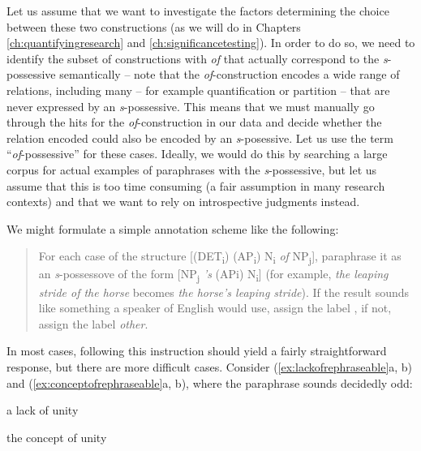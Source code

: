 Let us assume that we want to investigate the factors determining the choice between these two constructions (as we will do in Chapters \ref{ch:quantifyingresearch} and \ref{ch:significancetesting}). In order to do so, we need to identify the subset of constructions with \textit{of} that actually correspond to the \textit{s}-possessive semantically -- note that the \textit{of}-construction encodes a wide range of relations, including many -- for example quantification or partition -- that are never expressed by an \textit{s}-possessive. This means that we must manually go through the hits for the \textit{of}-construction in our data and decide whether the relation encoded could also be encoded by an \textit{s}-posessive. Let us use the term ``\textit{of}-possessive'' for these cases. Ideally, we would do this by searching a large corpus for actual examples of paraphrases with the \textit{s}-possessive, but let us assume that this is too time consuming (a fair assumption in many research contexts) and that we want to rely on introspective judgments instead.

We might formulate a simple annotation scheme like the following:

\begin{quote}
For each case of the structure [(DET\textsubscript{i}) (AP\textsubscript{i}) N\textsubscript{i} \textit{of} NP\textsubscript{j}], paraphrase it as an \textit{s}-possessove of the form [NP\textsubscript{j} \textit{'s} (APi) N\textsubscript{i}] (for example, \textit{the leaping stride of the horse} becomes \textit{the horse's leaping stride}). If the result sounds like something a speaker of English would use, assign the label , if not, assign the label \textit{other}.
\end{quote}

In most cases, following this instruction should yield a fairly straightforward response, but there are more difficult cases. Consider (\ref{ex:lackofrephraseable}a, b) and (\ref{ex:conceptofrephraseable}a, b), where the paraphrase sounds decidedly odd:

\begin{exe}
\ex
\begin{xlist}
\label{ex:lackofrephraseable}
\ex a lack of unity
\end{xlist}
\end{exe}

\begin{exe}
\ex
\begin{xlist}
\label{ex:conceptofrephraseable}
\ex the concept of unity
\end{xlist}
\end{exe}

